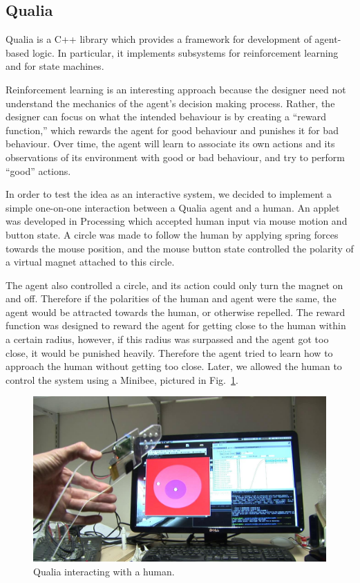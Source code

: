 \documentclass{article}
\begin{document}
\subsection{Qualia}

Qualia is a C++ library which provides a framework for development of
agent-based logic.
In particular, it implements subsystems for reinforcement learning and
for state machines.

Reinforcement learning is an interesting approach because the designer
need not understand the mechanics of the agent's decision making
process.
Rather, the designer can focus on what the intended behaviour is by
creating a ``reward function,'' which rewards the agent for good
behaviour and punishes it for bad behaviour.
Over time, the agent will learn to associate its own actions and its
observations of its environment with good or bad behaviour, and try to
perform ``good'' actions.

In order to test the idea as an interactive system, we decided to
implement a simple one-on-one interaction between a Qualia agent and a
human.
An applet was developed in Processing which accepted human input via
mouse motion and button state.
A circle was made to follow the human by applying spring forces
towards the mouse position, and the mouse button state controlled the
polarity of a virtual magnet attached to this circle.

The agent also controlled a circle, and its action could only turn the
magnet on and off.
Therefore if the polarities of the human and agent were the same, the
agent would be attracted towards the human, or otherwise repelled.
The reward function was designed to reward the agent for getting close
to the human within a certain radius, however, if this radius was
surpassed and the agent got too close, it would be punished heavily.
Therefore the agent tried to learn how to approach the human without
getting too close.
Later, we allowed the human to control the system using a Minibee,
pictured in Fig.~\ref{fig:qualia_minibee}.

\begin{figure}
\centerline{
  \includegraphics[width=4.5in]{qualia_minibee.jpg}}
  \caption{Qualia interacting with a human.}
\label{fig:qualia_minibee}
\end{figure}
\end{document}

